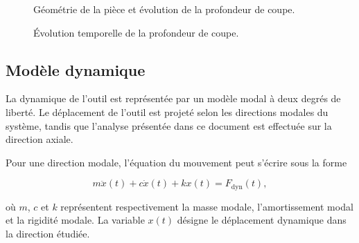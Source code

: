 \documentclass[
    11pt,
    a4paper
]{article}
\begin{document}

\begin{figure}[H]
    \centering
    \caption{Géométrie de la pièce et évolution de la profondeur de coupe.}
    \label{fig:geometrie_cone}
\end{figure}


\begin{figure}[H]
    \centering
    \caption{Évolution temporelle de la profondeur de coupe.}
    \label{fig:rampe_ap}
\end{figure}

\subsection{Modèle dynamique}
\label{subsec:modele-dynamique}

La dynamique de l'outil est représentée par un modèle modal à deux degrés de
liberté. Le déplacement de l'outil est projeté selon les directions modales du
système, tandis que l'analyse présentée dans ce document est effectuée sur la
direction axiale.

Pour une direction modale, l'équation du mouvement peut s'écrire sous la forme

\begin{equation}
    m\ddot{x}(t)
    +
    c\dot{x}(t)
    +
    kx(t)
    =
    F_{\mathrm{dyn}}(t),
    \label{eq:modele-dynamique}
\end{equation}

où \(m\), \(c\) et \(k\) représentent respectivement la masse modale,
l'amortissement modal et la rigidité modale. La variable \(x(t)\) désigne le
déplacement dynamique dans la direction étudiée.
\end{document}
